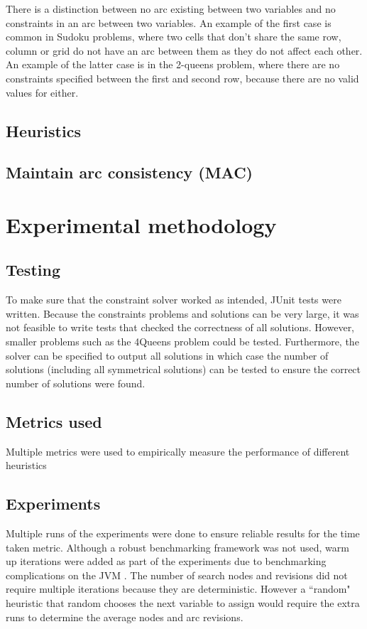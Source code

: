 \documentclass{article}
\begin{document}
There is a distinction between no arc existing between two variables and no constraints in an arc between two variables. An example of the first case is common in Sudoku problems, where two cells that don't share the same row, column or grid do not have an arc between them as they do not affect each other. An example of the latter case is in the 2-queens problem, where there are no constraints specified between the first and second row, because there are no valid values for either. 

\subsection{Heuristics}

\subsection{Maintain arc consistency (MAC)}

\section{Experimental methodology}

\subsection{Testing}
To make sure that the constraint solver worked as intended, JUnit tests were written. Because the constraints problems and solutions can be very large, it was not feasible to write tests that checked the correctness of all solutions. However, smaller problems such as the 4Queens problem could be tested. Furthermore, the solver can be specified to output all solutions in which case the number of solutions (including all symmetrical solutions) can be tested to ensure the correct number of solutions were found. 

\subsection{Metrics used}

Multiple metrics were used to empirically measure the performance of different heuristics

\subsection{Experiments}
Multiple runs of the experiments were done to ensure reliable results for the time taken metric. Although a robust benchmarking framework was not used, warm up iterations were added as part of the experiments due to benchmarking complications on the JVM \cite{jvm-benchmark}. 
\n
The number of search nodes and revisions did not require multiple iterations because they are deterministic. However a ``random" heuristic that random chooses the next variable to assign would require the extra runs to determine the average nodes and arc revisions.
\end{document}
